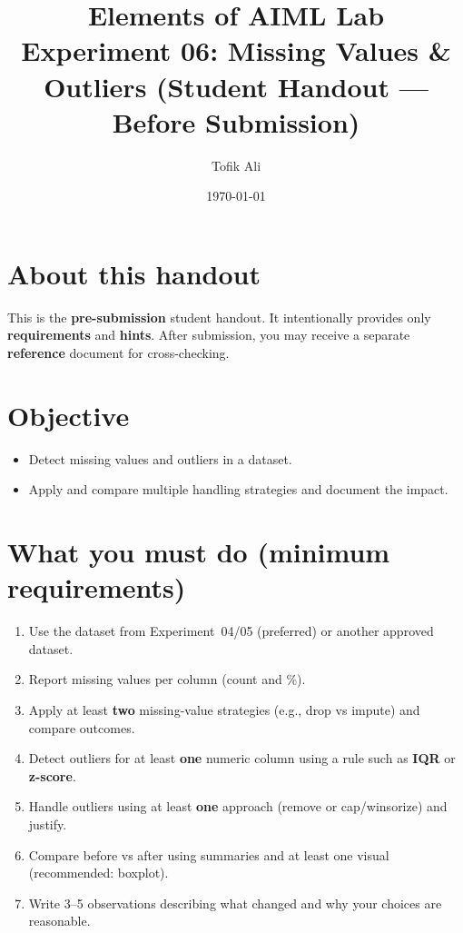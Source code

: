\documentclass[11pt]{article}
\title{Elements of AIML Lab\\Experiment 06: Missing Values \& Outliers (Student Handout — Before Submission)}
\author{Tofik Ali}
\date{\today}
\begin{document}
\maketitle
\tableofcontents

\section{About this handout}
This is the \textbf{pre-submission} student handout.
It intentionally provides only \textbf{requirements} and \textbf{hints}.
After submission, you may receive a separate \textbf{reference} document for cross-checking.

\section{Objective}
\begin{itemize}[leftmargin=*]
  \item Detect missing values and outliers in a dataset.
  \item Apply and compare multiple handling strategies and document the impact.
\end{itemize}

\section{What you must do (minimum requirements)}
\begin{enumerate}[leftmargin=*]
  \item Use the dataset from Experiment~04/05 (preferred) or another approved dataset.
  \item Report missing values per column (count and \%).
  \item Apply at least \textbf{two} missing-value strategies (e.g., drop vs impute) and compare outcomes.
  \item Detect outliers for at least \textbf{one} numeric column using a rule such as \textbf{IQR} or \textbf{z-score}.
  \item Handle outliers using at least \textbf{one} approach (remove or cap/winsorize) and justify.
  \item Compare before vs after using summaries and at least one visual (recommended: boxplot).
  \item Write 3--5 observations describing what changed and why your choices are reasonable.
\end{enumerate}
\end{document}

